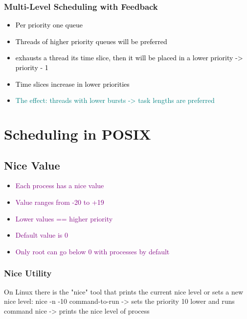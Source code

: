 \documentclass[main.tex,fontsize=8pt,paper=a4,paper=portrait,DIV=calc,]{scrartcl}
\begin{document}
\subsubsection{Multi-Level Scheduling with Feedback}
\begin{itemize}
\item \textcolor{black}{Per priority one queue}
\item \textcolor{black}{Threads of higher priority queues will be preferred}
\item \textcolor{black}{exhausts a thread its time slice, then it will be placed in a lower priority -> priority - 1 }
\item \textcolor{black}{Time slices increase in lower priorities}
\item \textcolor{teal}{The effect: threads with lower bursts -> task lengths are preferred}
\end{itemize} 

\section{Scheduling in POSIX}
\subsection{Nice Value}
\begin{itemize}
\item \textcolor{purple}{Each process has a nice value}
\item \textcolor{purple}{Value ranges from -20 to +19}
\item \textcolor{purple}{Lower values == higher priority}
\item \textcolor{purple}{Default value is 0}
\item \textcolor{purple}{Only root can go below 0 with processes by default}
\end{itemize} 
\subsubsection{Nice Utility}
On Linux there is the "nice" tool that prints the current nice level or sets a new nice level:\newline
nice -n -10 command-to-run -> sets the priority 10 lower and runs command\newline
nice -> prints the nice level of process
\end{document}
